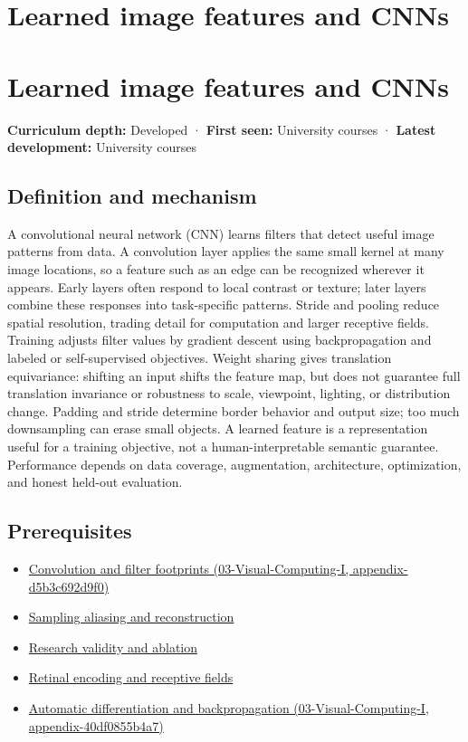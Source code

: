 \hypertarget{appendix-47c51ea026fb}{}
\section*{Learned image features and CNNs}
\section{Learned image features and CNNs}\label{learned-image-features-and-cnns}

\textbf{Curriculum depth:} Developed · \textbf{First seen:} University courses · \textbf{Latest development:} University courses

\subsection{Definition and mechanism}\label{definition-and-mechanism}

A convolutional neural network (CNN) learns filters that detect useful image patterns from data. A convolution layer applies the same small kernel at many image locations, so a feature such as an edge can be recognized wherever it appears. Early layers often respond to local contrast or texture; later layers combine these responses into task-specific patterns. Stride and pooling reduce spatial resolution, trading detail for computation and larger receptive fields. Training adjusts filter values by gradient descent using backpropagation and labeled or self-supervised objectives. Weight sharing gives translation equivariance: shifting an input shifts the feature map, but does not guarantee full translation invariance or robustness to scale, viewpoint, lighting, or distribution change. Padding and stride determine border behavior and output size; too much downsampling can erase small objects. A learned feature is a representation useful for a training objective, not a human-interpretable semantic guarantee. Performance depends on data coverage, augmentation, architecture, optimization, and honest held-out evaluation.

\subsection{Prerequisites}\label{prerequisites}

\begin{itemize}
\tightlist
\item
  \href{}{Convolution and filter footprints (03-Visual-Computing-I, appendix-d5b3c692d9f0)}
\item
  \hyperref[appendix-6a7869dd79a6]{Sampling aliasing and reconstruction}
\item
  \hyperref[appendix-65788587ef78]{Research validity and ablation}
\item
  \hyperref[appendix-7281c15ac44a]{Retinal encoding and receptive fields}
\item
  \href{}{Automatic differentiation and backpropagation (03-Visual-Computing-I, appendix-40df0855b4a7)}
\end{itemize}

